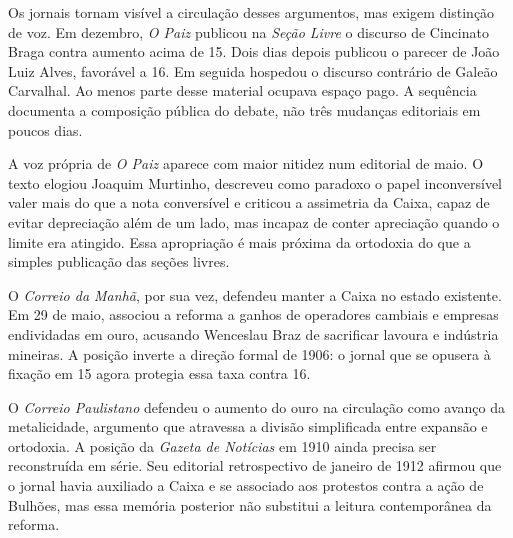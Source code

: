Os jornais tornam visível a circulação desses argumentos, mas exigem distinção de voz. Em dezembro, \textit{O Paiz} publicou na \textit{Seção Livre} o discurso de Cincinato Braga contra aumento acima de 15. Dois dias depois publicou o parecer de João Luiz Alves, favorável a 16. Em seguida hospedou o discurso contrário de Galeão Carvalhal. Ao menos parte desse material ocupava espaço pago. A sequência documenta a composição pública do debate, não três mudanças editoriais em poucos dias.


A voz própria de \textit{O Paiz} aparece com maior nitidez num editorial de maio. O texto elogiou Joaquim Murtinho, descreveu como paradoxo o papel inconversível valer mais do que a nota conversível e criticou a assimetria da Caixa, capaz de evitar depreciação além de um lado, mas incapaz de conter apreciação quando o limite era atingido. Essa apropriação é mais próxima da ortodoxia do que a simples publicação das seções livres.


O \textit{Correio da Manhã}, por sua vez, defendeu manter a Caixa no estado existente. Em 29 de maio, associou a reforma a ganhos de operadores cambiais e empresas endividadas em ouro, acusando Wenceslau Braz de sacrificar lavoura e indústria mineiras. A posição inverte a direção formal de 1906: o jornal que se opusera à fixação em 15 agora protegia essa taxa contra 16.


O \textit{Correio Paulistano} defendeu o aumento do ouro na circulação como avanço da metalicidade, argumento que atravessa a divisão simplificada entre expansão e ortodoxia. A posição da \textit{Gazeta de Notícias} em 1910 ainda precisa ser reconstruída em série. Seu editorial retrospectivo de janeiro de 1912 afirmou que o jornal havia auxiliado a Caixa e se associado aos protestos contra a ação de Bulhões, mas essa memória posterior não substitui a leitura contemporânea da reforma.


